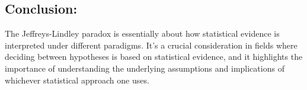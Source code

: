 \documentclass{article}
\begin{document}
\subsection*{Conclusion:}
The Jeffreys-Lindley paradox is essentially about how statistical evidence is interpreted under different paradigms. It's a crucial consideration in fields where deciding between hypotheses is based on statistical evidence, and it highlights the importance of understanding the underlying assumptions and implications of whichever statistical approach one uses.
\end{document}

